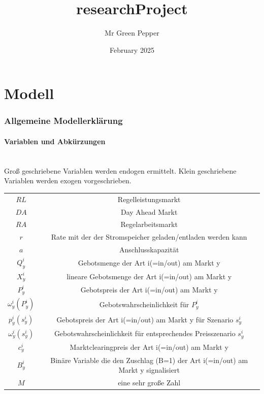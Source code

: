 \documentclass{article}
\title{researchProject}
\author{Mr Green Pepper}
\date{February 2025}
\begin{document}
\listoftodos
\doublespacing
\maketitle

\tableofcontents

\part{Modell}
\section{Allgemeine Modellerklärung}
\subsection{Variablen und Abkürzungen}
\\
Groß geschriebene Variablen werden endogen ermittelt. Klein geschriebene Variablen werden exogen vorgeschrieben.\\

\begin{tabular}{|c|c|}
        $RL$ & Regelleistungsmarkt\\
        $DA$ & Day Ahead Markt \\
        $RA$ & Regelarbeitsmarkt \\
        $r$ & Rate mit der der Stromspeicher geladen/entladen werden kann \\
        $a$ & Anschlusskapazität \\
        $Q^i_{y}$ & Gebotsmenge der Art i(=in/out) am Markt y \\
        $X^i_{y}$ & lineare Gebotsmenge der Art i(=in/out) am Markt y \\
        $P^i_{y}$ & Gebotspreis der Art i(=in/out) am Markt y\\
        $\omega^i_{y}(P^i_{y})$ & Gebotswahrscheinlichkeit für $P^i_{y}$\\
        $p^i_{y}(s^i_y)$ & Gebotspreis der Art i(=in/out) am Markt y für Szenario $s^i_y$\\
        $\omega^i_{y}(s^i_y)$ & Gebotswahrscheinlichkeit für entsprechendes Preisszenario $s^i_y$\\
        $c^i_y$ &  Marktclearingpreis der Art i(=in/out) am Markt y\\
        $B^i_y$ &  Binäre Variable die den Zuschlag (B=1) der Art i(=in/out) am Markt y signalisiert\\
        $M$ &  eine sehr große Zahl\\
    \end{tabular}
\label{tab:my_label}\\
\\
\end{document}
